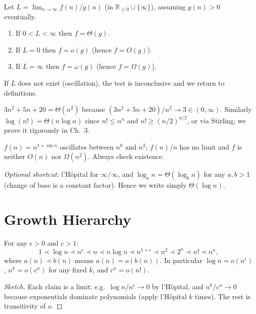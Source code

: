 \begin{theorem}
Let $L=\lim_{n\to\infty}f(n)/g(n)$ (in $\mathbb{R}_{\ge0}\cup\{\infty\}$), assuming $g(n)>0$ eventually.
\begin{enumerate}[label=(\alph*)]
    \item If $0<L<\infty$ then $f=\Theta(g)$.
    \item If $L=0$ then $f=o(g)$ (hence $f=O(g)$).
    \item If $L=\infty$ then $f=\omega(g)$ (hence $f=\Omega(g)$).
\end{enumerate}
If $L$ does not exist (oscillation), the test is inconclusive and we return to definitions.
\end{theorem}

\begin{example}
$3n^{2}+5n+20=\Theta(n^{2})$ because $(3n^{2}+5n+20)/n^{2}\to3\in(0,\infty)$. Similarly $\log(n!)=\Theta(n\log n)$ since $n!\le n^{n}$ and $n!\ge(n/2)^{n/2}$, or via Stirling; we prove it rigorously in Ch.~3.
\end{example}
\begin{example}
$f(n)=n^{1+\sin n}$ oscillates between $n^{0}$ and $n^{2}$; $f(n)/n$ has no limit and $f$ is neither $O(n)$ nor $\Omega(n^{2})$. Always check existence.
\end{example}
\emph{Optional shortcut:} l'H\^opital for $\infty/\infty$, and $\log_{a}n=\Theta(\log_{b}n)$ for any $a,b>1$ (change of base is a constant factor). Hence we write simply $\Theta(\log n)$.

\section{Growth Hierarchy}
\label{sec:hierarchy}
\begin{theorem}[Hierarchy]
For any $\epsilon>0$ and $c>1$:
\[
1 \prec \log n \prec n^{\epsilon} \prec n \prec n\log n \prec n^{1+\epsilon} \prec n^{2}\prec 2^{n}\prec n! \prec n^{n},
\]
where $a(n)\prec b(n)$ means $a(n)=o(b(n))$. In particular $\log n=o(n^{\epsilon})$, $n^{k}=o(c^{n})$ for any fixed $k$, and $c^{n}=o(n!)$.
\end{theorem}
\begin{proof}[Sketch]
Each claim is a limit: e.g.\ $\log n/n^{\epsilon}\to0$ by l'H\^opital, and $n^{k}/c^{n}\to0$ because exponentials dominate polynomials (apply l'H\^opital $k$ times). The rest is transitivity of $o$.
\end{proof}

